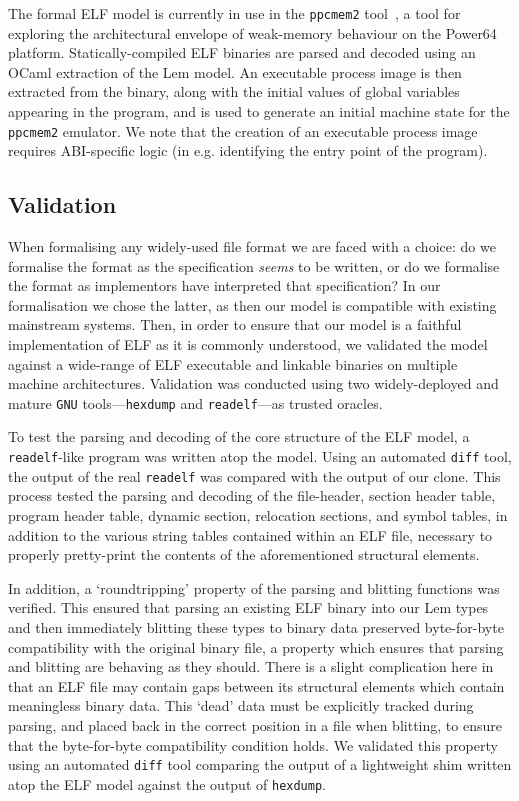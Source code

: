 The formal ELF model is currently in use in the \texttt{ppcmem2} tool~\cite{gray-integrated-2015}, a tool for exploring the architectural envelope of weak-memory behaviour on the Power64 platform.
Statically-compiled ELF binaries are parsed and decoded using an OCaml extraction of the Lem model.
An executable process image is then extracted from the binary, along with the initial values of global variables appearing in the program, and is used to generate an initial machine state for the \texttt{ppcmem2} emulator.
We note that the creation of an executable process image requires ABI-specific logic (in e.g. identifying the entry point of the program).

\subsection{Validation}
\label{subsect.elf.validation}

When formalising any widely-used file format we are faced with a choice: do we formalise the format as the specification \emph{seems} to be written, or do we formalise the format as implementors have interpreted that specification?
In our formalisation we chose the latter, as then our model is compatible with existing mainstream systems.
Then, in order to ensure that our model is a faithful implementation of ELF as it is commonly understood, we validated the model against a wide-range of ELF executable and linkable binaries on multiple machine architectures.
Validation was conducted using two widely-deployed and mature \texttt{GNU} tools---\texttt{hexdump} and \texttt{readelf}---as trusted oracles.

To test the parsing and decoding of the core structure of the ELF model, a \texttt{readelf}-like program was written atop the model.
Using an automated \texttt{diff} tool, the output of the real \texttt{readelf} was compared with the output of our clone.
This process tested the parsing and decoding of the file-header, section header table, program header table, dynamic section, relocation sections, and symbol tables, in addition to the various string tables contained within an ELF file, necessary to properly pretty-print the contents of the aforementioned structural elements.

In addition, a `roundtripping' property of the parsing and blitting functions was verified.
This ensured that parsing an existing ELF binary into our Lem types and then immediately blitting these types to binary data preserved byte-for-byte compatibility with the original binary file, a property which ensures that parsing and blitting are behaving as they should.
There is a slight complication here in that an ELF file may contain gaps between its structural elements which contain meaningless binary data.
This `dead' data must be explicitly tracked during parsing, and placed back in the correct position in a file when blitting, to ensure that the byte-for-byte compatibility condition holds.
We validated this property using an automated \texttt{diff} tool comparing the output of a lightweight shim written atop the ELF model against the output of \texttt{hexdump}.

